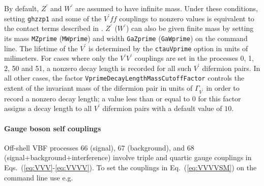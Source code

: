 \documentclass[aps,superscriptaddress,nofootinbib]{revtex4}
\begin{document}
By default, $Z^\prime$ and $W^\prime$ are assumed to have infinite mass. Under these conditions, setting \verb|ghzzp1| and  some of the $V^\prime ff$ couplings to nonzero values is equivalent to the contact terms described in \cite{Gonzalez-Alonso:2014eva}.  $Z^\prime$ ($W^\prime$) can also be given finite mass by setting its mass \verb|MZprime| (\verb|MWprime|) and width \verb|GaZprime| (\verb|GaWprime|) on the command line. The lifetime of the $V^\prime$ is determined by the \verb|ctauVprime| option in units of milimeters. For cases where only the $V^\prime V^\prime$ couplings are set in the processes 0, 1, 2, 50 and 51, a nonzero decay length is recorded for all such $V^\prime$ difermion pairs. In all other cases, the factor \verb|VprimeDecayLengthMassCutoffFactor| controls the extent of the invariant mass of the difermion pair in units of $\Gamma_{V^\prime}$ in order to record a nonzero decay length; a value less than or equal to $0$ for this factor assigns a decay length to all $V^\prime$ difermion pairs with a default value of $10$.\\


\paragraph{Gauge boson self couplings}
\label{TGCQGC}
Off-shell VBF processes 66 (signal), 67 (background), and 68 (signal+background+interference) involve triple and 
quartic gauge couplings in Eqs.~(\ref{eq:VVV}-\ref{eq:VVVV}).
To set the couplings in Eq.~(\ref{eq:VVVVSM}) on the command line use e.g. 
\end{document}
